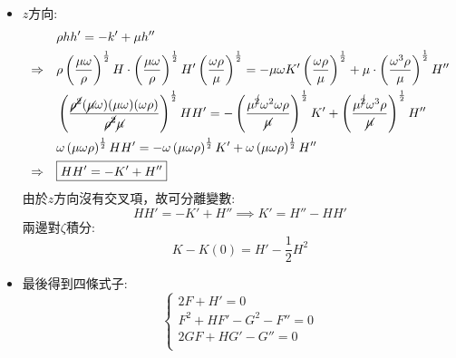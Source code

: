 \documentclass[../main.tex]{subfiles}
\begin{document}
\begin{itemize}
\begin{enumerate}
\begin{itemize}
\begin{align}
        & 2\omega GF + \omega HG' = \omega G'' \nonumber\\
        \Rightarrow \quad & \boxed{2 GF + H G' - G'' = 0} \label{eq:ch2_3_rotating_disk_theta_dimensionless} 
      \end{align}
      \item $z$方向:
      \begin{align}
        & \rho h h' = -k' + \mu h'' \nonumber\\
        \Rightarrow \quad & \rho \left(
            \frac{\mu \omega}{\rho}
          \right)^{\frac{1}{2}} H \cdot \left(
            \frac{\mu \omega}{\rho}
          \right)^{\frac{1}{2}} H' \left(\frac{\omega \rho}{\mu}\right)^{\frac{1}{2}} =
           -\mu \omega K' \left(\frac{\omega \rho}{\mu}\right)^{\frac{1}{2}} + \mu \cdot \left(\frac{\omega^3 \rho}{\mu}\right)^{\frac{1}{2}} H'' \nonumber\\
        & \left(\frac{
          \cancel{\rho^2} (\cancel{\mu} \omega) (\mu\omega) (\omega \rho)
        }{\cancel{\rho^2} \cancel{\mu}}\right)^{\frac{1}{2}} HH' = -\left(
          \frac{\mu^{\cancel{2}}\omega^2 \omega \rho}{\cancel{\mu}}
        \right)^{\frac{1}{2}} K' + \left(
          \frac{\mu^{\cancel{2}}\omega^3 \rho}{\cancel{\mu}}
        \right)^{\frac{1}{2}} H'' \nonumber\\
        & \omega\left(\mu \omega \rho\right)^{\frac{1}{2}} HH' = -\omega \left(\mu\omega \rho\right)^{\frac{1}{2}} K' + \omega\left(
          \mu\omega \rho
        \right)^{\frac{1}{2}} H'' \nonumber\\
        \Rightarrow \quad & \boxed{H H' = - K' + H''} \label{eq:ch2_3_rotating_disk_z_dimensionless}
      \end{align} 
      由於$z$方向沒有交叉項，故可分離變數:
      \begin{equation}
        HH' = -K' + H'' \implies K' = H'' - HH'
      \end{equation}
      兩邊對$\zeta$積分:
      \begin{equation}
        \boxed{K - K(0) = H' - \frac{1}{2}H^2} \label{eq:ch2_3_rotating_disk_pressure_dimensionless}
      \end{equation}
      \item 最後得到四條式子:
      \begin{equation}
        \begin{cases}
          2 F + H' = 0 \\
          F^2 + H F' - G^2 - F'' = 0 \\
          2 GF + H G' - G'' = 0 \\

\end{cases}
\end{equation}
\end{itemize}
\end{enumerate}
\end{itemize}
\end{document}
